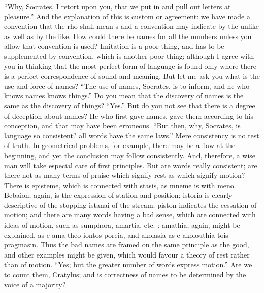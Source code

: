 \documentclass[11pt,letter]{article}
\begin{document}
“Why, Socrates, I retort upon you, that we put in and pull out letters at pleasure.” And the explanation of this is custom or agreement: we have made a convention that the rho shall mean s and a convention may indicate by the unlike as well as by the like. How could there be names for all the numbers unless you allow that convention is used? Imitation is a poor thing, and has to be supplemented by convention, which is another poor thing; although I agree with you in thinking that the most perfect form of language is found only where there is a perfect correspondence of sound and meaning. But let me ask you what is the use and force of names? “The use of names, Socrates, is to inform, and he who knows names knows things.” Do you mean that the discovery of names is the same as the discovery of things? “Yes.” But do you not see that there is a degree of deception about names? He who first gave names, gave them according to his conception, and that may have been erroneous. “But then, why, Socrates, is language so consistent? all words have the same laws.” Mere consistency is no test of truth. In geometrical problems, for example, there may be a flaw at the beginning, and yet the conclusion may follow consistently. And, therefore, a wise man will take especial care of first principles. But are words really consistent; are there not as many terms of praise which signify rest as which signify motion? There is episteme, which is connected with stasis, as mneme is with meno. Bebaion, again, is the expression of station and position; istoria is clearly descriptive of the stopping istanai of the stream; piston indicates the cessation of motion; and there are many words having a bad sense, which are connected with ideas of motion, such as sumphora, amartia, etc. : amathia, again, might be explained, as e ama theo iontos poreia, and akolasia as e akolouthia tois pragmasin. Thus the bad names are framed on the same principle as the good, and other examples might be given, which would favour a theory of rest rather than of motion. “Yes; but the greater number of words express motion.” Are we to count them, Cratylus; and is correctness of names to be determined by the voice of a majority?
\end{document}
